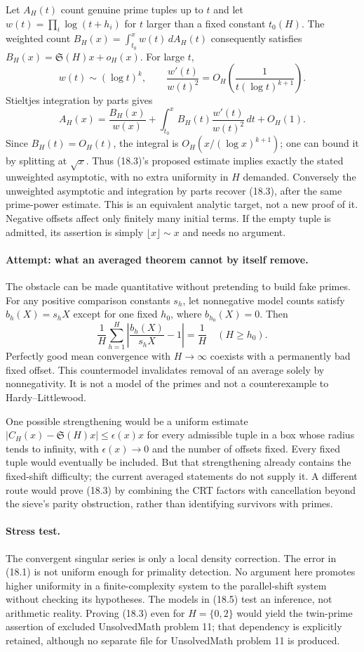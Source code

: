 \documentclass[11pt,a4paper]{article}
\begin{document}
Let $A_H(t)$ count genuine prime tuples up to $t$ and let
$w(t)=\prod_i\log(t+h_i)$ for $t$ larger than a fixed constant $t_0(H)$.
The weighted count $B_H(x)=\int_{t_0}^xw(t)\,dA_H(t)$ consequently satisfies
$B_H(x)=\mathfrak S(H)x+o_H(x)$. For large $t$,
\[
 w(t)\sim(\log t)^k,\qquad
 \frac{w'(t)}{w(t)^2}=O_H\!\left(\frac1{t(\log t)^{k+1}}\right).
\]
Stieltjes integration by parts gives
\[
 A_H(x)=\frac{B_H(x)}{w(x)}
       +\int_{t_0}^x B_H(t)\frac{w'(t)}{w(t)^2}\,dt+O_H(1).
 \tag{18.4}
\]
Since $B_H(t)=O_H(t)$, the integral is
$O_H(x/(\log x)^{k+1})$; one can bound it by splitting at $\sqrt{x}$.
Thus (18.3)'s proposed estimate implies exactly the stated unweighted
asymptotic, with no extra uniformity in $H$ demanded. Conversely the
unweighted asymptotic and integration by parts recover (18.3), after the
same prime-power estimate. This is an equivalent analytic target, not a
new proof of it. Negative offsets affect only finitely many initial terms.
If the empty tuple is admitted, its assertion is simply $\lfloor x\rfloor
\sim x$ and needs no argument.

\paragraph{Attempt: what an averaged theorem cannot by itself remove.}
The obstacle can be made quantitative without pretending to build fake
primes. For any positive comparison constants $s_h$, let nonnegative
model counts satisfy $b_h(X)=s_hX$ except for one fixed $h_0$, where
$b_{h_0}(X)=0$. Then
\[
 \frac1H\sum_{h=1}^H
 \left|\frac{b_h(X)}{s_hX}-1\right|=\frac1H
 \quad(H\geq h_0).
 \tag{18.5}
\]
Perfectly good mean convergence with $H\to\infty$ coexists with a
permanently bad fixed offset. This countermodel invalidates removal of an
average solely by nonnegativity. It is not a model of the primes and
not a counterexample to Hardy--Littlewood.

One possible strengthening would be a uniform estimate
$|C_H(x)-\mathfrak S(H)x|\leq \epsilon(x)x$ for every admissible tuple in
a box whose radius tends to infinity, with $\epsilon(x)\to0$ and the
number of offsets fixed. Every fixed tuple would eventually be included.
But that strengthening already contains the fixed-shift difficulty; the
current averaged statements do not supply it. A different route would
prove (18.3) by combining the CRT factors with cancellation beyond the
sieve's parity obstruction, rather than identifying survivors with primes.

\paragraph{Stress test.}
The convergent singular series is only a local density correction. The
error in (18.1) is not uniform enough for primality detection. No argument
here promotes higher uniformity in a finite-complexity system to the
parallel-shift system without checking its hypotheses. The models in
(18.5) test an inference, not arithmetic reality. Proving (18.3) even for
$H=\{0,2\}$ would yield the twin-prime assertion of excluded UnsolvedMath problem 11;
that dependency is explicitly retained, although no separate file for
UnsolvedMath problem 11 is produced.
\end{document}

